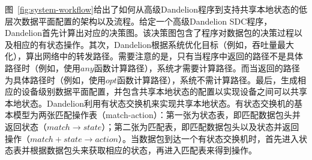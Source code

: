 \documentclass{ctexart}
\begin{document}
图~\ref{fig:system-workflow}给出了如何从高级Dandelion程序到支持共享本地状态的低层次数据平面配置的架构以及流程。给定一个高级Dandelion SDC程序，Dandelion首先计算出对应的决策图。该决策图包含了程序对数据包的决策过程以及相应的有状态操作。其次，Dandelion根据系统优化目标（例如，吞吐量最大化），算出网络中的转发路径。需要注意的是，只有当程序中返回的路径不是具体路径时（例如，使用$any$函数计算路径），系统才需要计算路径。而当返回的路径为具体路径时（例如，使用$opt$函数计算路径），系统不需计算路径。最后，生成相应的设备级别数据平面配置，并包含共享本地状态的配置以实现设备之间可以共享本地状态。Dandelion利用有状态交换机来实现共享本地状态。有状态交换机的基本模型为两张匹配操作表（match-action）：第一张为状态表，即匹配数据包头并返回状态（$match \rightarrow state$）；第二张为匹配表，即匹配数据包头以及状态并返回操作（$match+state \rightarrow action$）。当数据包到达一个有状态交换机时，首先进入状态表并根据数据包头来获取相应的状态，再进入匹配表来得到操作。

\end{document}
